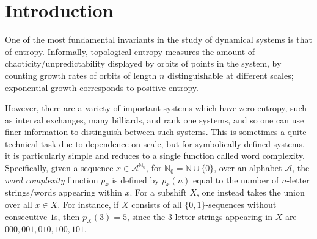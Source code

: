 \documentclass[11pt,reqno]{amsart}
\theoremstyle{definition}
\theoremstyle{plain}
\newcommand{\OO}{\mathrm{Orb}}
\newcommand{\Z}{\mathbb{Z}}
\newcommand{\N}{\mathbb{N}}
\begin{document}
    

   




   





\setcounter{tocdepth}{2}
\tableofcontents

\section{Introduction}





One of the most fundamental invariants in the study of dynamical systems is that of entropy. Informally, topological entropy measures the amount of chaoticity/unpredictability displayed by orbits of points in the system, by counting growth rates of orbits of length $n$ distinguishable at different scales; exponential growth corresponds to positive entropy.

However, there are a variety of important systems which have zero entropy, such as interval exchanges, many billiards, and rank one systems, and so one can use finer information to distinguish between such systems. This is sometimes a quite technical task due to dependence on scale, but for symbolically defined systems, it is particularly simple and reduces to a single function called word complexity. Specifically, given a sequence $x \in \mathcal{A}^{\N_0}$, for $\N_0 = \N \cup \{0\}$, over an alphabet $\mathcal{A}$, the \emph{word complexity} function $p_x$ is defined by $p_x(n)$ equal to the number of $n$-letter strings/words appearing within $x$. For a subshift $X$, one instead takes the union over all $x \in X$. For instance, if $X$ consists of all $\{0,1\}$-sequences without consecutive $1$s, then $p_X(3) = 5$, since the $3$-letter strings appearing in $X$ are $000, 001, 010, 100, 101$. 
\end{document}
